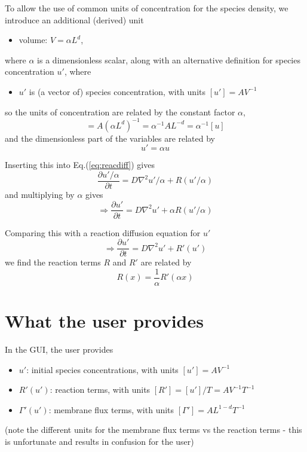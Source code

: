 \documentclass{article}
\begin{document}
To allow the use of common units of concentration for the species density, we introduce an additional (derived) unit
\begin{itemize}
    \item volume: $V = \alpha L^d$,
\end{itemize}
where $\alpha$ is a dimensionless scalar, along with an alternative definition for species concentration $u'$, where
\begin{itemize}
    \item $u'$ is (a vector of) species concentration, with units $[u'] = A V^{-1}$
\end{itemize}
so the units of concentration are related by the constant factor $\alpha$,
\begin{equation}
    [u'] = A (\alpha L^d)^{-1} = \alpha^{-1} A L^{-d} = \alpha^{-1} [u]
\end{equation}
and the dimensionless part of the variables are related by
\begin{equation}
    u' = \alpha u
\end{equation}

Inserting this into Eq.(\ref{eq:reacdiff}) gives
\begin{equation}
    \frac{\partial u'/\alpha}{\partial t} = D \nabla^2 u'/\alpha + R(u'/\alpha)
\end{equation}
and multiplying by $\alpha$ gives
\begin{equation}
   \Rightarrow \frac{\partial u'}{\partial t} = D \nabla^2 u' + \alpha R(u'/\alpha)
\end{equation}

Comparing this with a reaction diffusion equation for $u'$
\begin{equation}
   \label{eq:reacdiffprime}
   \Rightarrow \frac{\partial u'}{\partial t} = D \nabla^2 u' + R'(u')
\end{equation}
we find the reaction terms $R$ and $R'$ are related by
\begin{equation}
   R(x) = \frac{1}{\alpha} R'(\alpha x)
\end{equation}

\section{What the user provides}

In the GUI, the user provides
\begin{itemize}
    \item $u'$: initial species concentrations, with units $[u'] = A V^{-1}$
    \item $R'(u')$: reaction terms, with units $[R'] = [u']/T = A V^{-1} T^{-1}$
    \item $\Gamma'(u')$: membrane flux terms, with units $[\Gamma'] = A L^{1-d} T^{-1}$
\end{itemize}
(note the different units for the membrane flux terms vs the reaction terms - this is unfortunate and results in confusion for the user)
\end{document}
